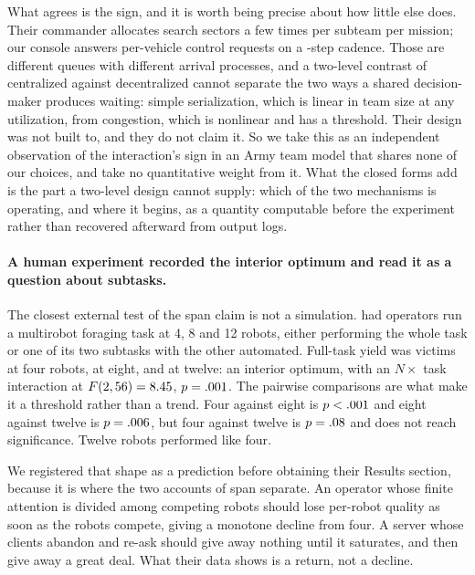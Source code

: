 \documentclass[11pt]{article}
\begin{document}
What agrees is the sign, and it is worth being precise about how little else does. Their commander allocates search sectors a few times per subteam per mission; our console answers per-vehicle control requests on a \qDecisionInterval{}-step cadence. Those are different queues with different arrival processes, and a two-level contrast of centralized against decentralized cannot separate the two ways a shared decision-maker produces waiting: simple serialization, which is linear in team size at any utilization, from congestion, which is nonlinear and has a threshold. Their design was not built to, and they do not claim it. So we take this as an independent observation of the interaction's sign in an Army team model that shares none of our choices, and take no quantitative weight from it. What the closed forms add is the part a two-level design cannot supply: which of the two mechanisms is operating, and where it begins, as a quantity computable before the experiment rather than recovered afterward from output logs.

\paragraph{A human experiment recorded the interior optimum and read it as a question about subtasks.} The closest external test of the span claim is not a simulation. \citet{lewis2010choosing} had operators run a multirobot foraging task at 4, 8 and 12 robots, either performing the whole task or one of its two subtasks with the other automated. Full-task yield was \lwFullFour{} victims at four robots, \lwFullEight{} at eight, and \lwFullTwelve{} at twelve: an interior optimum, with an $N \times$ task interaction at $F(2, 56) = 8.45$, $p = .001$. The pairwise comparisons are what make it a threshold rather than a trend. Four against eight is $p <.001$ and eight against twelve is $p = .006$, but four against twelve is $p = .08$ and does not reach significance. Twelve robots performed like four.

We registered that shape as a prediction before obtaining their Results section, because it is where the two accounts of span separate. An operator whose finite attention is divided among competing robots should lose per-robot quality as soon as the robots compete, giving a monotone decline from four. A server whose clients abandon and re-ask should give away nothing until it saturates, and then give away a great deal. What their data shows is a return, not a decline.
\end{document}
